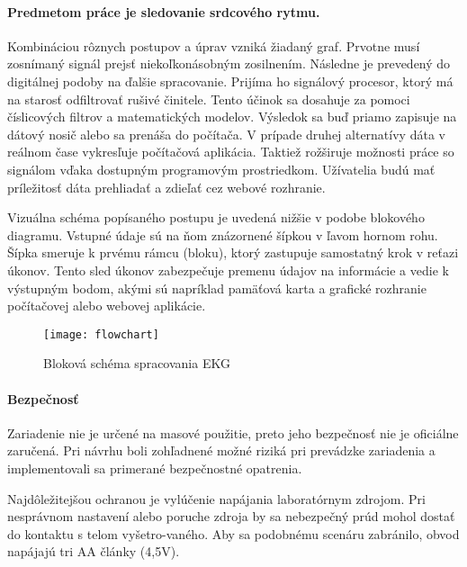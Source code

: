 \documentclass[titlepage,12pt]{article}
\begin{document}
\paragraph{Predmetom práce je sledovanie srdcového rytmu.} Kombináciou rôznych postupov a úprav vzniká žiadaný graf. Prvotne musí zosnímaný signál prejsť niekoľkonásobným zosilnením. Následne je prevedený do digitálnej podoby na ďalšie spracovanie. Prijíma ho signálový procesor, ktorý má na starosť odfiltrovať rušivé činitele. Tento účinok sa dosahuje za pomoci číslicových filtrov a matematických modelov. Výsledok sa buď priamo zapisuje na dátový nosič  alebo sa prenáša do počítača. V prípade druhej alternatívy dáta v reálnom čase vykresľuje počítačová aplikácia. Taktiež rožširuje možnosti práce so signálom vďaka dostupným programovým prostriedkom. Užívatelia budú mať príležitosť dáta prehliadať a zdieľať cez webové rozhranie.

Vizuálna schéma popísaného postupu je uvedená nižšie v podobe blokového diagramu. \linebreak Vstupné údaje sú na ňom znázornené šípkou v ľavom hornom rohu. Šípka smeruje k prvému rámcu (bloku), ktorý zastupuje samostatný krok v reťazi úkonov. Tento sled úkonov zabezpečuje premenu údajov na informácie a vedie k výstupným bodom, akými sú napríklad pamäťová karta a grafické rozhranie počítačovej alebo webovej aplikácie.



\begin{figure}[!ht]
\begin{center}
\texttt{[image: flowchart]}
\caption{Bloková schéma spracovania EKG}
\end{center}
\end{figure}

\newpage

\paragraph{Bezpečnosť}
Zariadenie nie je určené na masové použitie, preto jeho bezpečnosť nie je oficiálne zaručená. Pri návrhu boli zohľadnené možné riziká pri prevádzke zariadenia a implementovali sa primerané bezpečnostné opatrenia. 

Najdôležitejšou ochranou je vylúčenie napájania laboratórnym zdrojom. Pri nesprávnom nastavení alebo poruche zdroja by sa nebezpečný prúd mohol dostať do kontaktu s telom vyšetro-vaného. Aby sa podobnému scenáru zabránilo, obvod napájajú tri AA články (4,5V). 
\end{document}

